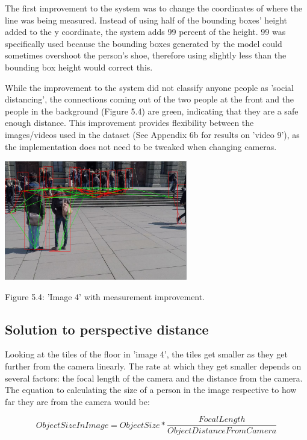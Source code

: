 \documentclass[12pt]{report}
\begin{document}
The first improvement to the system was to change the coordinates of where the line was being measured. Instead of using half of the bounding boxes' height added to the y coordinate, the system adds 99 percent of the height. 99 was specifically used because the bounding boxes generated by the model could sometimes overshoot the person's shoe, therefore using slightly less than the bounding box height would correct this. 

\vspace{2mm}

While the improvement to the system did not classify anyone people as 'social distancing', the connections coming out of the two people at the front and the people in the background  (Figure 5.4) are green, indicating that they are a safe enough distance. This improvement provides flexibility between the images/videos used in the dataset (See Appendix 6b for results on 'video 9'), as the implementation does not need to be tweaked when changing cameras. 

\begin{center}
	\includegraphics[width=80mm]{./images/appendix/BoundingBoxBottom.JPG}
	
	{\footnotesize Figure 5.4: 'Image 4' with measurement improvement.}
\end{center}

\subsection*{Solution to perspective distance}

Looking at the tiles of the floor in 'image 4', the tiles get smaller as they get further from the camera linearly. The rate at which they get smaller depends on several factors: the focal length of the camera and the distance from the camera. The equation to calculating the size of a person in the image respective to how far they are from the camera would be:

\begin{equation*}
Object Size In Image = Object Size * \frac{Focal Length}{Object Distance From Camera}
\end{equation*}
\end{document}
